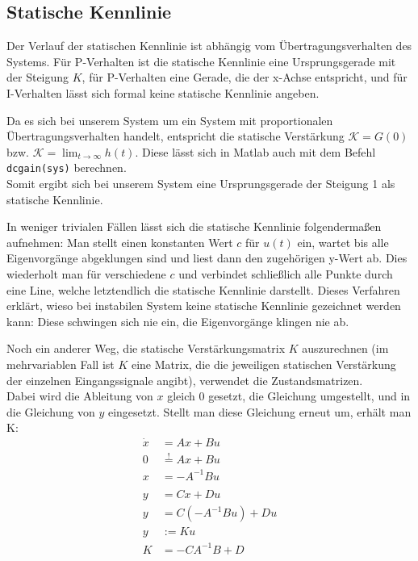

\subsection{Statische Kennlinie}
Der Verlauf der statischen Kennlinie ist abhängig vom Übertragungsverhalten des Systems. Für P-Verhalten ist die statische Kennlinie eine Ursprungsgerade mit der Steigung $K$, für P-Verhalten eine Gerade, die der x-Achse entspricht, und für I-Verhalten lässt sich formal keine statische Kennlinie angeben.

Da es sich bei unserem System um ein System mit proportionalen Übertragungsverhalten handelt, entspricht die statische Verstärkung $\mathcal{K} = G(0)$ bzw. $\mathcal{K} = \lim_{t\to \infty} h(t)$. Diese lässt sich in Matlab auch mit dem Befehl \texttt{dcgain(sys)} berechnen. \\
Somit ergibt sich bei unserem System eine Ursprungsgerade der Steigung 1 als statische Kennlinie. 

In weniger trivialen Fällen lässt sich die statische Kennlinie folgendermaßen aufnehmen: Man stellt einen konstanten Wert $c$ für $u(t)$ ein, wartet bis alle Eigenvorgänge abgeklungen sind und liest dann den zugehörigen y-Wert ab. Dies wiederholt man für verschiedene $c$ und verbindet schließlich alle Punkte durch eine Line, welche letztendlich die statische Kennlinie darstellt. Dieses Verfahren erklärt, wieso bei instabilen System keine statische Kennlinie gezeichnet werden kann: Diese schwingen sich nie ein, die Eigenvorgänge klingen nie ab.

Noch ein anderer Weg, die statische Verstärkungsmatrix $K$ auszurechnen (im mehrvariablen Fall ist $K$ eine Matrix, die die jeweiligen statischen Verstärkung der einzelnen Eingangssignale angibt), verwendet die Zustandsmatrizen. \\
Dabei wird die Ableitung von $x$ gleich 0 gesetzt, die Gleichung umgestellt, und in die Gleichung von $y$ eingesetzt. Stellt man diese Gleichung erneut um, erhält man K:
\begin{align*}
\dot x &= Ax + Bu \\
0 &\stackrel{!}{=} Ax + Bu \\
x &= -A^{-1}Bu\\ \\
y &= Cx + Du \\
y &= C(-A^{-1}Bu) + Du \\
y &:= Ku \\
K &= -CA^{-1}B + D
\end{align*}

